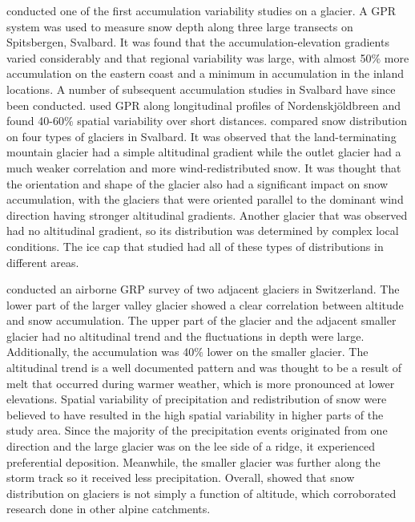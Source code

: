 \documentclass{sfuthesis}
\begin{document}
\cite{Winther1998} conducted one of the first accumulation variability studies on a glacier. A GPR system was used to measure snow depth along three large transects on Spitsbergen, Svalbard. It was found that the accumulation-elevation gradients varied considerably and that regional variability was large, with almost 50$\%$ more accumulation on the eastern coast and a minimum in accumulation in the inland locations. A number of subsequent accumulation studies in Svalbard have since been conducted. \cite{Palli2002} used GPR along longitudinal profiles of Nordenskj\"{o}ldbreen and found 40-60$\%$ spatial variability over short distances. \cite{Grabiec2011} compared snow distribution on four types of glaciers in Svalbard. It was observed that the land-terminating mountain glacier had a simple altitudinal gradient while the outlet glacier had a much weaker correlation and more wind-redistributed snow. It was thought that the orientation and shape of the glacier also had a significant impact on snow accumulation, with the glaciers that were oriented parallel to the dominant wind direction having stronger altitudinal gradients. Another glacier that was observed had no altitudinal gradient, so its distribution was determined by complex local conditions. The ice cap that \cite{Grabiec2011} studied had all of these types of distributions in different areas.

\cite{Machguth2006} conducted an airborne GRP survey of two adjacent glaciers in Switzerland. The lower part of the larger valley glacier showed a clear correlation between altitude and snow accumulation. The upper part of the glacier and the adjacent smaller glacier had no altitudinal trend and the fluctuations in depth were large. Additionally, the accumulation was 40$\%$ lower on the smaller glacier. The altitudinal trend is a well documented pattern and was thought to be a result of melt that occurred during warmer weather, which is more pronounced at lower elevations. Spatial variability of precipitation and redistribution of snow were believed to have resulted in the high spatial variability in higher parts of the study area. Since the majority of the precipitation events originated from one direction and the large glacier was on the lee side of a ridge, it experienced preferential deposition. Meanwhile, the smaller glacier was further along the storm track so it received less precipitation. Overall, \cite{Machguth2006} showed that snow distribution on glaciers is not simply a function of altitude, which corroborated research done in other alpine catchments.
\end{document}
